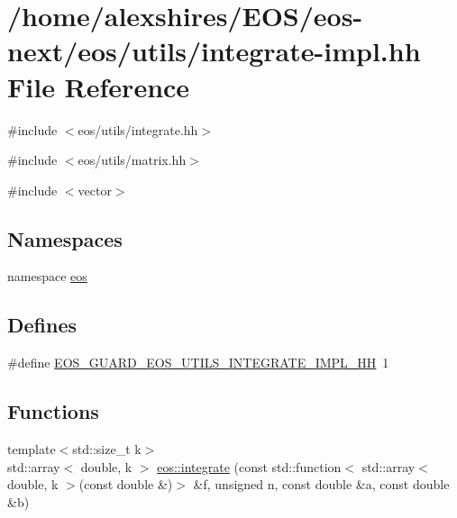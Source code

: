 \hypertarget{integrate-impl_8hh}{
\section{/home/alexshires/EOS/eos-\/next/eos/utils/integrate-\/impl.hh File Reference}
\label{integrate-impl_8hh}
}
{\ttfamily \#include $<$eos/utils/integrate.hh$>$}\par
{\ttfamily \#include $<$eos/utils/matrix.hh$>$}\par
{\ttfamily \#include $<$vector$>$}\par
\subsection*{Namespaces}
\begin{DoxyCompactItemize}
\item 
namespace \hyperlink{namespaceeos}{eos}
\end{DoxyCompactItemize}
\subsection*{Defines}
\begin{DoxyCompactItemize}
\item 
\#define \hyperlink{integrate-impl_8hh_abe221cef1fdc513194f8407ddfe24335}{EOS\_\-GUARD\_\-EOS\_\-UTILS\_\-INTEGRATE\_\-IMPL\_\-HH}~1
\end{DoxyCompactItemize}
\subsection*{Functions}
\begin{Indent}{\bf }\par
{\em \label{_amgrpd41d8cd98f00b204e9800998ecf8427e}
 }\begin{DoxyCompactItemize}
\item 
{\footnotesize template$<$std::size\_\-t k$>$ }\\std::array$<$ double, k $>$ \hyperlink{namespaceeos_aa97e022b32760a5d657bc35b9151efb8}{eos::integrate} (const std::function$<$ std::array$<$ double, k $>$(const double \&)$>$ \&f, unsigned n, const double \&a, const double \&b)
\end{DoxyCompactItemize}
\end{Indent}


